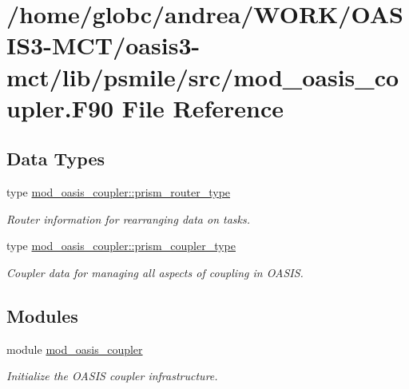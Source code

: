 \hypertarget{mod__oasis__coupler_8_f90}{}\section{/home/globc/andrea/\+W\+O\+R\+K/\+O\+A\+S\+I\+S3-\/\+M\+C\+T/oasis3-\/mct/lib/psmile/src/mod\+\_\+oasis\+\_\+coupler.F90 File Reference}
\label{mod__oasis__coupler_8_f90}
\subsection*{Data Types}
\begin{DoxyCompactItemize}
\item 
type \hyperlink{structmod__oasis__coupler_1_1prism__router__type}{mod\+\_\+oasis\+\_\+coupler\+::prism\+\_\+router\+\_\+type}
\begin{DoxyCompactList}\small\item\em Router information for rearranging data on tasks. \end{DoxyCompactList}\item 
type \hyperlink{structmod__oasis__coupler_1_1prism__coupler__type}{mod\+\_\+oasis\+\_\+coupler\+::prism\+\_\+coupler\+\_\+type}
\begin{DoxyCompactList}\small\item\em Coupler data for managing all aspects of coupling in O\+A\+S\+IS. \end{DoxyCompactList}\end{DoxyCompactItemize}
\subsection*{Modules}
\begin{DoxyCompactItemize}
\item 
module \hyperlink{namespacemod__oasis__coupler}{mod\+\_\+oasis\+\_\+coupler}
\begin{DoxyCompactList}\small\item\em Initialize the O\+A\+S\+IS coupler infrastructure. \end{DoxyCompactList}\end{DoxyCompactItemize}
